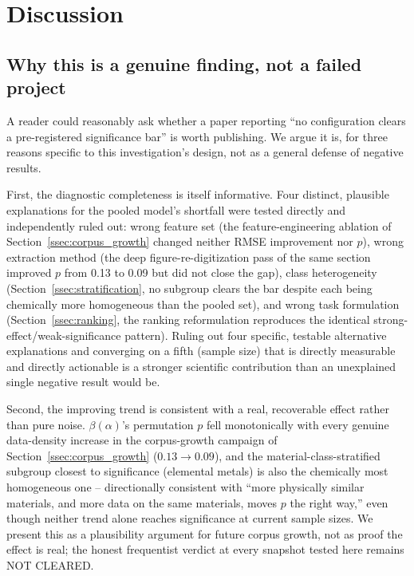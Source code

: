 \documentclass[aip,amsmath,amssymb,reprint]{revtex4-1}
\begin{document}
\section{Discussion}
\label{sec:discussion}

\subsection{Why this is a genuine finding, not a failed project}
\label{ssec:disc_genuine}

A reader could reasonably ask whether a paper reporting ``no
configuration clears a pre-registered significance bar'' is worth
publishing. We argue it is, for three reasons specific to this
investigation's design, not as a general defense of negative results.

First, the diagnostic completeness is itself informative. Four
distinct, plausible explanations for the pooled model's shortfall were
tested directly and independently ruled out: wrong feature set (the
feature-engineering ablation of Section~\ref{ssec:corpus_growth}
changed neither RMSE improvement nor $p$), wrong extraction method
(the deep figure-re-digitization pass of the same section improved $p$
from 0.13 to 0.09 but did not close the gap), class heterogeneity
(Section~\ref{ssec:stratification}, no subgroup clears the bar despite
each being chemically more homogeneous than the pooled set), and wrong
task formulation (Section~\ref{ssec:ranking}, the ranking
reformulation reproduces the identical strong-effect/weak-significance
pattern). Ruling out four specific, testable alternative explanations
and converging on a fifth (sample size) that is directly measurable
and directly actionable is a stronger scientific contribution than an
unexplained single negative result would be.

Second, the improving trend is consistent with a real, recoverable
effect rather than pure noise. $\beta(\alpha)$'s permutation $p$ fell
monotonically with every genuine data-density increase in the
corpus-growth campaign of Section~\ref{ssec:corpus_growth}
($0.13\rightarrow 0.09$), and the material-class-stratified subgroup
closest to significance (elemental metals) is also the chemically most
homogeneous one -- directionally consistent with ``more physically
similar materials, and more data on the same materials, moves $p$ the
right way,'' even though neither trend alone reaches significance at
current sample sizes. We present this as a plausibility argument for
future corpus growth, not as proof the effect is real; the honest
frequentist verdict at every snapshot tested here remains NOT CLEARED.
\end{document}
